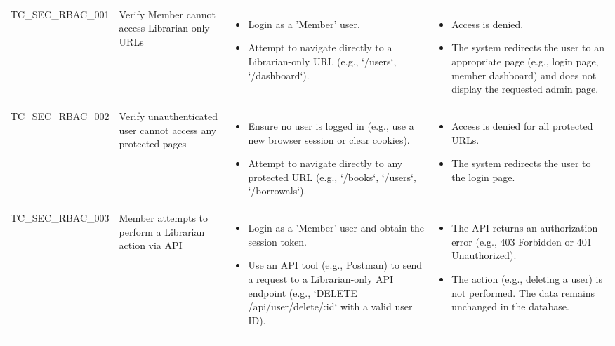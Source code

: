\documentclass[10pt, a4paper]{report}
\begin{document}
\begin{longtable}{|>{\raggedright\arraybackslash}p{3cm}|>{\raggedright\arraybackslash}p{3cm}|>{\raggedright\arraybackslash}p{5cm}|>{\raggedright\arraybackslash}p{5cm}|}
\multicolumn{4}{|l|}{\textbf{Sub-Section: Access Control \& Authorization (RBAC)}} \\ \hline
TC\_SEC\_RBAC\_001 & Verify Member cannot access Librarian-only URLs  & 
    \begin{itemize}
        \item Login as a 'Member' user.
        \item Attempt to navigate directly to a Librarian-only URL (e.g., `/users`, `/dashboard`).
    \end{itemize} & 
    \begin{itemize}
        \item Access is denied.
        \item The system redirects the user to an appropriate page (e.g., login page, member dashboard) and does not display the requested admin page.
    \end{itemize} \\ \hline
TC\_SEC\_RBAC\_002 & Verify unauthenticated user cannot access any protected pages  & 
    \begin{itemize}
        \item Ensure no user is logged in (e.g., use a new browser session or clear cookies).
        \item Attempt to navigate directly to any protected URL (e.g., `/books`, `/users`, `/borrowals`).
    \end{itemize} & 
    \begin{itemize}
        \item Access is denied for all protected URLs.
        \item The system redirects the user to the login page.
    \end{itemize} \\ \hline
TC\_SEC\_RBAC\_003 & Member attempts to perform a Librarian action via API  & 
    \begin{itemize}
        \item Login as a 'Member' user and obtain the session token.
        \item Use an API tool (e.g., Postman) to send a request to a Librarian-only API endpoint (e.g., `DELETE /api/user/delete/:id` with a valid user ID).
    \end{itemize} & 
    \begin{itemize}
        \item The API returns an authorization error (e.g., 403 Forbidden or 401 Unauthorized).
        \item The action (e.g., deleting a user) is not performed. The data remains unchanged in the database.
    \end{itemize} \\ \hline


\end{longtable}
\end{document}
